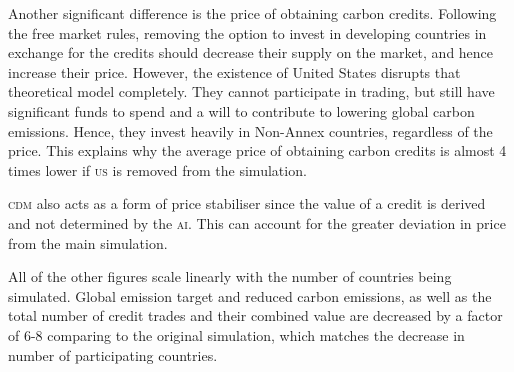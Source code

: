 Another significant difference is the price of obtaining carbon credits. Following the free market rules, removing the option to invest in developing countries in exchange for the credits should decrease their supply on the market, and hence increase their price. However, the existence of United States disrupts that theoretical model completely. They cannot participate in trading, but still have significant funds to spend and a will to contribute to lowering global carbon emissions. Hence, they invest heavily in Non-Annex countries, regardless of the price. This explains why the average price of obtaining carbon credits is almost 4 times lower if \textsc{us} is removed from the simulation.

\textsc{cdm} also acts as a form of price stabiliser since the value of a credit is derived and not determined by the \textsc{ai}.  This can account for the greater deviation in price from the main simulation.

All of the other figures scale linearly with the number of countries being simulated. Global emission target and reduced carbon emissions, as well as the total number of credit trades and their combined value are decreased by a factor of 6-8 comparing to the original simulation, which matches the decrease in number of participating countries.
